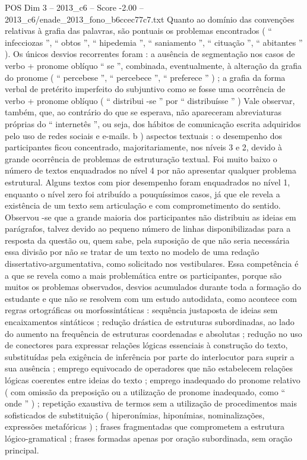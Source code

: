 \begin{textsample}{POS Dim 3 – 2013\_c6 – Score -2.00 – 2013\_c6/enade\_2013\_fono\_b6ccec77c7.txt}
Quanto ao domínio das convenções relativas à grafia das palavras, são pontuais os problemas encontrados ( “ infecciozas ”, “ obtos ”, “ hipedemia ”, “ saniamento ”, “ cituação ”, “ abitantes ” ).
Os únicos desvios recorrentes foram : a ausência de segmentação nos casos de verbo + pronome oblíquo “ se ”, combinada, eventualmente, à alteração da grafia do pronome ( “ percebese ”, “ percebece ”, “ preferece ” ) ; a grafia da forma verbal de pretérito imperfeito do subjuntivo como se fosse uma ocorrência de verbo + pronome oblíquo ( “ distribui -se ” por “ distribuísse ” ) Vale observar, também, que, ao contrário do que se esperava, não apareceram abreviaturas próprias do “ internetês ”, ou seja, dos hábitos de comunicação escrita adquiridos pelo uso de redes sociais e e-mails. b ) aspectos textuais : o desempenho dos participantes ficou concentrado, majoritariamente, nos níveis 3 e 2, devido à grande ocorrência de problemas de estruturação textual.
Foi muito baixo o número de textos enquadrados no nível 4 por não apresentar qualquer problema estrutural.
Alguns textos com pior desempenho foram enquadrados no nível 1, enquanto o nível zero foi atribuído a pouquíssimos casos, já que ele revela a existência de um texto sem articulação e com comprometimento do sentido.
Observou -se que a grande maioria dos participantes não distribuiu as ideias em parágrafos, talvez devido ao pequeno número de linhas disponibilizadas para a resposta da questão ou, quem sabe, pela suposição de que não seria necessária essa divisão por não se tratar de um texto no modelo de uma redação dissertativo-argumentativa, como solicitado nos vestibulares.
Essa competência é a que se revela como a mais problemática entre os participantes, porque são muitos os problemas observados, desvios acumulados durante toda a formação do estudante e que não se resolvem com um estudo autodidata, como acontece com regras ortográficas ou morfossintáticas : sequência justaposta de ideias sem encaixamentos sintáticos ; redução drástica de estruturas subordinadas, ao lado do aumento na frequência de estruturas coordenadas e absolutas ; redução no uso de conectores para expressar relações lógicas essenciais à construção do texto, substituídas pela exigência de inferência por parte do interlocutor para suprir a sua ausência ; emprego equivocado de operadores que não estabelecem relações lógicas coerentes entre ideias do texto ; emprego inadequado do pronome relativo ( com omissão da preposição ou a utilização de pronome inadequado, como “ onde ” ) ; repetição exaustiva de termos sem a utilização de procedimentos mais sofisticados de substituição ( hiperonímias, hiponímias, nominalizações, expressões metafóricas ) ; frases fragmentadas que comprometem a estrutura lógico-gramatical ; frases formadas apenas por oração subordinada, sem oração principal.

\end{textsample}
